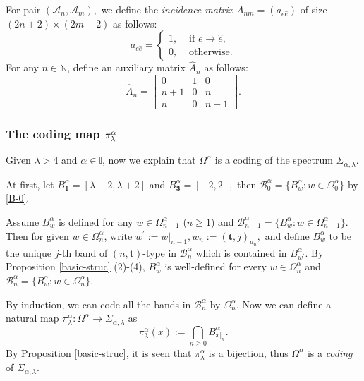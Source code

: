 \documentclass[reqno,11pt,graphicx,]{amsart}
\numberwithin{equation}{section}
\theoremstyle{plain}
\newcommand{\3}{\mathbf{3}}
\begin{document}
	
	For pair $({\mathscr A}_n, {\mathscr A}_m),$ we define the \textit{incidence
		matrix} $A_{nm}= (a_{e \hat e})$ of size $(2n+2)\times(2m+2)$ as follows: 
	\begin{equation}\label{A_ij}
		a_{e\hat e}= 
		\begin{cases}
			1, & \text{ if } e\to \hat e, \\ 
			0, & \text{ otherwise}.%
		\end{cases}%
	\end{equation}
	For any $n\in {\mathbb{N}}$, define an
	auxiliary matrix $\hat A_n$ as follows: 
	\begin{equation}\label{hat-A-n}
		\hat A_n= \left[%
		\begin{array}{ccc}
			0 & 1 & 0 \\ 
			n+1 & 0 & n \\ 
			n & 0 & n-1%
		\end{array}%
		\right].
	\end{equation}
	
	\subsubsection{The coding map $\protect\pi^{\protect\alpha}_\protect\lambda$}
	
	\label{sec-coding-map} Given $\lambda>4$ and $\alpha\in{\mathbb{I}}$, now we
	explain that $\Omega^{\alpha}$ is a coding of the spectrum $%
	\Sigma_{\alpha,\lambda}$. 
	
	At first, let
	$B_{\mathbf{1}}^{\alpha}=[\lambda-2,\lambda+2]$ and $B_{\mathbf{3}}^{\alpha}=[-2,2],
	$
	then ${\mathcal{B}}_0^{\alpha}=\{B_w^{\alpha}: w\in \Omega_0^{\alpha}\}$ by \eqref{B-0}.
	
	Assume $B_w^{\alpha}$ is defined for any $w\in\Omega_{n-1}^{\alpha} $ ($n\geq 1$) and
	$
	{\mathcal{B}}_{n-1}^{\alpha}=\{B_w^{\alpha}: w\in
	\Omega_{n-1}^{\alpha}\}.
	$
	Then for given $w\in\Omega_n^{\alpha}$, write 
	$
	w^{\prime }:=w|_{n-1}, w_n:=(\mathbf{t},j)_{a_n},
	$
	and define $B_w^{\alpha}$ to be the unique $j$-th band of $(n,\mathbf{t}%
	)$-type in ${\mathcal{B}}_{n}^{\alpha}$ which is contained in $B_{w^\prime}^{\alpha}$. By Proposition \ref{basic-struc} (2)-(4), $%
	B_w^{\alpha}$ is well-defined for every $w\in \Omega_n^{\alpha}$
	and 
	$
	{\mathcal{B}}_{n}^{\alpha}=\{B_w^{\alpha}: w\in
	\Omega_{n}^{\alpha}\}.
	$
	
	By induction, we can code all the bands in ${\mathcal{B}}_n^{\alpha}$
	by $\Omega_n^{\alpha}.$ Now we can define a natural map $\pi^{\alpha}_\lambda:\Omega^{\alpha}\to
	\Sigma_{\alpha,\lambda}$ as 
	\begin{equation}  \label{pi^a}
		\pi^{\alpha}_\lambda(x):=\bigcap_{n\ge 0} B_{x|_n}^{\alpha}.
	\end{equation}
	By Proposition \ref{basic-struc}, it is seen that $\pi^{\alpha}_\lambda$ is
	a bijection, thus $\Omega^{\alpha}$ is a \textit{coding} of $%
	\Sigma_{\alpha,\lambda}$. 
	
\end{document}
